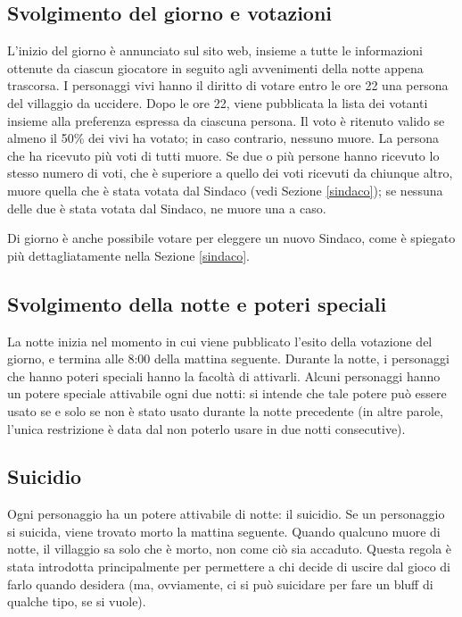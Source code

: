 \documentclass[a4paper,10pt]{article}
\begin{document}
\subsection{Svolgimento del giorno e votazioni}

L'inizio del giorno è annunciato sul sito web, insieme a tutte le informazioni ottenute da ciascun giocatore in seguito agli avvenimenti della notte appena trascorsa.
I personaggi vivi hanno il diritto di votare entro le ore 22 una persona del villaggio da uccidere. Dopo le ore 22, viene pubblicata la lista dei votanti insieme alla preferenza espressa da ciascuna persona. Il voto è ritenuto valido se almeno il 50\% dei vivi ha votato; in caso contrario, nessuno muore. La persona che ha ricevuto più voti di tutti muore. Se due o più persone hanno ricevuto lo stesso numero di voti, che è superiore a quello dei voti ricevuti da chiunque altro, muore quella che è stata votata dal Sindaco (vedi Sezione \ref{sindaco}); se nessuna delle due è stata votata dal Sindaco, ne muore una a caso.

Di giorno è anche possibile votare per eleggere un nuovo Sindaco, come è spiegato più dettagliatamente nella Sezione \ref{sindaco}.


\subsection{Svolgimento della notte e poteri speciali}

La notte inizia nel momento in cui viene pubblicato l'esito della votazione del giorno, e termina alle 8:00 della mattina seguente.
Durante la notte, i personaggi che hanno poteri speciali hanno la facoltà di attivarli.
Alcuni personaggi hanno un potere speciale attivabile ogni due notti: si intende che tale potere può essere usato se e solo se non è stato usato durante la notte precedente (in altre parole, l'unica restrizione è data dal non poterlo usare in due notti consecutive).


\subsection{Suicidio}

Ogni personaggio ha un potere attivabile di notte: il suicidio.
Se un personaggio si suicida, viene trovato morto la mattina seguente. Quando qualcuno muore di notte, il villaggio sa solo che è morto, non come ciò sia accaduto.
Questa regola è stata introdotta principalmente per permettere a chi decide di uscire dal gioco di farlo quando desidera (ma, ovviamente, ci si può suicidare per fare un bluff di qualche tipo, se si vuole).
\end{document}
